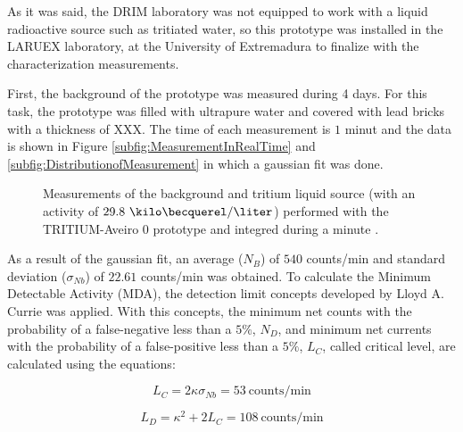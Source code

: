 As it was said, the DRIM laboratory was not equipped to work with a liquid radioactive source such as tritiated water, so this prototype was installed in the LARUEX laboratory, at the University of Extremadura to finalize with the characterization measurements. 

First, the background of the prototype was measured during 4 days. For this task, the prototype was filled with ultrapure water and covered with lead bricks with a thickness of XXX. The time of each measurement is $1$ minut and the data is shown in Figure \ref{subfig:MeasurementInRealTime} and \ref{subfig:DistributionofMeasurement} in which a gaussian fit was done. 

\begin{figure}[h]
 \centering
 \caption{Measurements of the background and tritium liquid source (with an activity of $29.8~\kilo\becquerel/\liter$) performed with the TRITIUM-Aveiro 0 prototype and integred during a minute \cite{ExperimentalPaperCarlos}.}
 \label{fig:BackgroundTritium1min}
\end{figure}

As a result of the gaussian fit, an average ($N_B$) of $540$ counts/min and standard deviation ($\sigma_{Nb}$) of $22.61$ counts/min was obtained. To calculate the Minimum Detectable Activity (MDA), the detection limit concepts developed by Lloyd A. Currie \cite{CurieLimit} was applied.  With this concepts, the minimum net counts with the probability of a false-negative less than a $5\%$, $N_D$, and minimum net currents with the probability of a false-positive less than a $5\%$, $L_C$, called critical level, are calculated using the equations:

\begin{equation}
L_C = 2\kappa\sigma_{Nb} =53 ~\text{counts/min}
\label{eq:EquationCriticalLimit}
\end{equation}

\begin{equation}
L_D = \kappa^2 + 2L_C = 108~\text{counts/min}
\label{eq:EquationNetCounts}
\end{equation}

